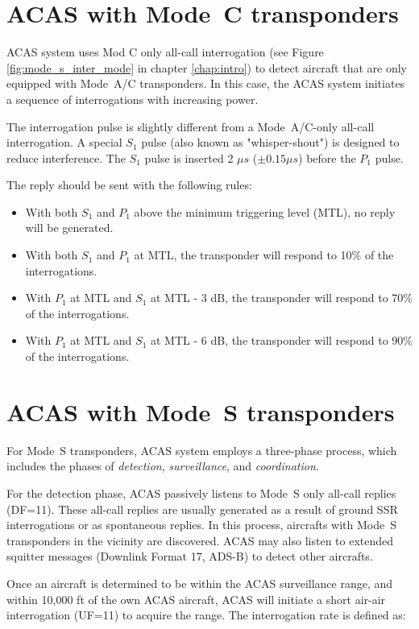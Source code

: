 \section{ACAS with Mode~C transponders}

ACAS system uses Mod C only all-call interrogation (see Figure \ref{fig:mode_s_inter_mode} in chapter \ref{chap:intro}) to detect aircraft that are only equipped with Mode~A/C transponders. In this case, the ACAS system initiates a sequence of interrogations with increasing power.

The interrogation pulse is slightly different from a Mode~A/C-only all-call interrogation. A special $S_1$ pulse (also known as "whisper-shout") is designed to reduce interference. The $S_1$ pulse is inserted 2 $\mu s$ ($\pm 0.15 \mu s$) before the $P_1$ pulse.

The reply should be sent with the following rules:

\begin{itemize}
  \item With both $S_1$ and $P_1$ above the minimum triggering level (MTL), no reply will be generated.
  \item With both $S_1$ and $P_1$ at MTL, the transponder will respond to 10\% of the interrogations.
  \item With $P_1$ at MTL and $S_1$ at MTL - 3 dB, the transponder will respond to 70\% of the interrogations.
  \item With $P_1$ at MTL and $S_1$ at MTL - 6 dB, the transponder will respond to 90\% of the interrogations.
\end{itemize}

\section{ACAS with Mode~S transponders}

For Mode~S transponders, ACAS system employs a three-phase process, which includes the phases of \emph{detection}, \emph{surveillance}, and \emph{coordination}.

For the detection phase, ACAS passively listens to Mode~S only all-call replies (DF=11). These all-call replies are usually generated as a result of ground SSR interrogations or as spontaneous replies. In this process, aircrafts with Mode~S transponders in the vicinity are discovered. ACAS may also listen to extended squitter messages (Downlink Format 17, ADS-B) to detect other aircrafts.

Once an aircraft is determined to be within the ACAS surveillance range, and within 10,000 ft of the own ACAS aircraft, ACAS will initiate a short air-air interrogation (UF=11) to acquire the range. The interrogation rate is defined as:

